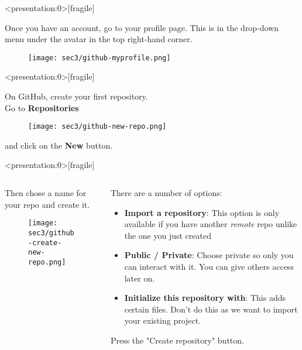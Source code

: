 \begin{frame}<presentation:0>[fragile]
\emptyframetitle

  Once you have an account, go to your profile page. This is in the drop-down menu under the avatar in the top right-hand corner.
  \begin{figure}[h]
    \texttt{[image: sec3/github-myprofile.png]}
  \end{figure}

\end{frame}

\begin{frame}<presentation:0>[fragile]
\emptyframetitle

  On GitHub, create your first repository.\\[0.25cm]
  Go to \textbf{Repositories}
  \begin{figure}[h]
    \texttt{[image: sec3/github-new-repo.png]}
  \end{figure}
  and click on the \textbf{New} button.

\end{frame}


\begin{frame}<presentation:0>[fragile]
\emptyframetitle

  \begin{columns}

    \begin{column}{0.5\textwidth}
      Then chose a name for your repo and create it.
      \begin{figure}[h]
        \texttt{[image: sec3/github-create-new-repo.png]}
      \end{figure}
    \end{column}

    \begin{column}{0.5\textwidth}
      There are a number of options:
      \begin{itemize}
        \item \textbf{Import a repository}: This option is only available if you have another \textit{remote} repo unlike the one you just created
        \item \textbf{Public / Private}: Choose private so only you can interact with it. You can give others access later on.
        \item \textbf{Initialize this repository with}: This adds certain files. Don't do this as we want to import your existing project.
      \end{itemize}
   
\vspace*{0.25cm}   Press the "Create repository" button.
    \end{column}
  \end{columns}

\end{frame}

